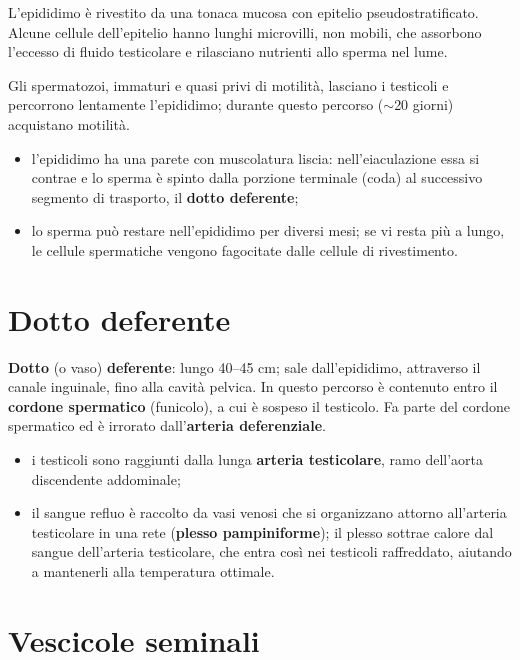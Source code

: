 L'epididimo è rivestito da una tonaca mucosa con epitelio pseudostratificato. Alcune cellule
dell'epitelio hanno lunghi microvilli, non mobili, che assorbono l'eccesso di fluido testicolare
e rilasciano nutrienti allo sperma nel lume.

Gli spermatozoi, immaturi e quasi privi di motilità, lasciano i testicoli e percorrono lentamente
l'epididimo; durante questo percorso ($\sim$20 giorni) acquistano motilità.
\begin{itemize}
  \item l'epididimo ha una parete con muscolatura liscia: nell'eiaculazione essa si contrae e lo
    sperma è spinto dalla porzione terminale (coda) al successivo segmento di trasporto, il
    \textbf{dotto deferente};
  \item lo sperma può restare nell'epididimo per diversi mesi; se vi resta più a lungo, le cellule
    spermatiche vengono fagocitate dalle cellule di rivestimento.
\end{itemize}

\section{Dotto deferente}

\textbf{Dotto} (o vaso) \textbf{deferente}: lungo 40--45 cm; sale dall'epididimo, attraverso il
canale inguinale, fino alla cavità pelvica. In questo percorso è contenuto entro il
\textbf{cordone spermatico} (funicolo), a cui è sospeso il testicolo. Fa parte del cordone
spermatico ed è irrorato dall'\textbf{arteria deferenziale}.

\begin{itemize}
  \item i testicoli sono raggiunti dalla lunga \textbf{arteria testicolare}, ramo dell'aorta
    discendente addominale;
  \item il sangue refluo è raccolto da vasi venosi che si organizzano attorno all'arteria
    testicolare in una rete (\textbf{plesso pampiniforme}); il plesso sottrae calore dal sangue
    dell'arteria testicolare, che entra così nei testicoli raffreddato, aiutando a mantenerli alla
    temperatura ottimale.
\end{itemize}

\section{Vescicole seminali}

